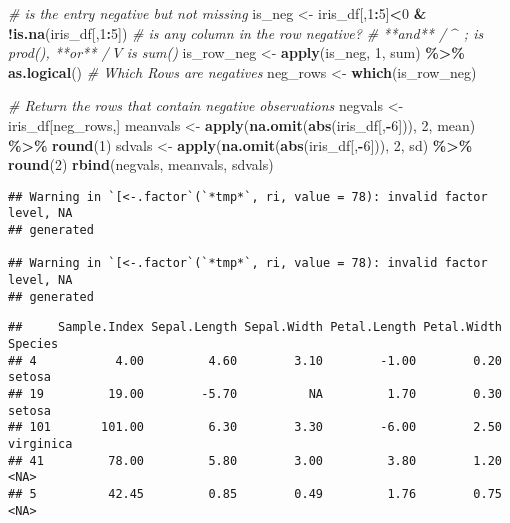 \documentclass[
]{article}
\newenvironment{Shaded}{\begin{snugshade}}{\end{snugshade}}
\newcommand{\CommentTok}[1]{\textcolor[rgb]{0.56,0.35,0.01}{\textit{#1}}}
\newcommand{\DecValTok}[1]{\textcolor[rgb]{0.00,0.00,0.81}{#1}}
\newcommand{\KeywordTok}[1]{\textcolor[rgb]{0.13,0.29,0.53}{\textbf{#1}}}
\newcommand{\NormalTok}[1]{#1}
\newcommand{\OperatorTok}[1]{\textcolor[rgb]{0.81,0.36,0.00}{\textbf{#1}}}
\newcommand{\StringTok}[1]{\textcolor[rgb]{0.31,0.60,0.02}{#1}}
\begin{document}
\begin{Shaded}
\begin{Highlighting}[]
\CommentTok{\# is the entry negative but not missing}
\NormalTok{is\_neg <{-}}\StringTok{ }\NormalTok{iris\_df[,}\DecValTok{1}\OperatorTok{:}\DecValTok{5}\NormalTok{]}\OperatorTok{<}\DecValTok{0} \OperatorTok{\&}\StringTok{ }\OperatorTok{!}\KeywordTok{is.na}\NormalTok{(iris\_df[,}\DecValTok{1}\OperatorTok{:}\DecValTok{5}\NormalTok{]) }
\CommentTok{\# is any column in the row negative?}
  \CommentTok{\# **and** / $\^{}$ ; is \textasciigrave{}prod()\textasciigrave{}, **or** / $V$ is \textasciigrave{}sum()\textasciigrave{}}
\NormalTok{is\_row\_neg <{-}}\StringTok{ }\KeywordTok{apply}\NormalTok{(is\_neg, }\DecValTok{1}\NormalTok{, sum) }\OperatorTok{\%>\%}\StringTok{ }\KeywordTok{as.logical}\NormalTok{()}
\CommentTok{\# Which Rows are negatives}
\NormalTok{neg\_rows <{-}}\StringTok{ }\KeywordTok{which}\NormalTok{(is\_row\_neg)}

\CommentTok{\# Return the rows that contain negative observations}
\NormalTok{negvals  <{-}}\StringTok{ }\NormalTok{iris\_df[neg\_rows,]}
\NormalTok{meanvals <{-}}\StringTok{ }\KeywordTok{apply}\NormalTok{(}\KeywordTok{na.omit}\NormalTok{(}\KeywordTok{abs}\NormalTok{(iris\_df[,}\OperatorTok{{-}}\DecValTok{6}\NormalTok{])), }\DecValTok{2}\NormalTok{, mean) }\OperatorTok{\%>\%}\StringTok{ }\KeywordTok{round}\NormalTok{(}\DecValTok{1}\NormalTok{)}
\NormalTok{sdvals   <{-}}\StringTok{ }\KeywordTok{apply}\NormalTok{(}\KeywordTok{na.omit}\NormalTok{(}\KeywordTok{abs}\NormalTok{(iris\_df[,}\OperatorTok{{-}}\DecValTok{6}\NormalTok{])), }\DecValTok{2}\NormalTok{, sd) }\OperatorTok{\%>\%}\StringTok{ }\KeywordTok{round}\NormalTok{(}\DecValTok{2}\NormalTok{)}
\KeywordTok{rbind}\NormalTok{(negvals, meanvals, sdvals) }
\end{Highlighting}
\end{Shaded}

\begin{verbatim}
## Warning in `[<-.factor`(`*tmp*`, ri, value = 78): invalid factor level, NA
## generated

## Warning in `[<-.factor`(`*tmp*`, ri, value = 78): invalid factor level, NA
## generated
\end{verbatim}

\begin{verbatim}
##     Sample.Index Sepal.Length Sepal.Width Petal.Length Petal.Width   Species
## 4           4.00         4.60        3.10        -1.00        0.20    setosa
## 19         19.00        -5.70          NA         1.70        0.30    setosa
## 101       101.00         6.30        3.30        -6.00        2.50 virginica
## 41         78.00         5.80        3.00         3.80        1.20      <NA>
## 5          42.45         0.85        0.49         1.76        0.75      <NA>
\end{verbatim}
\end{document}
